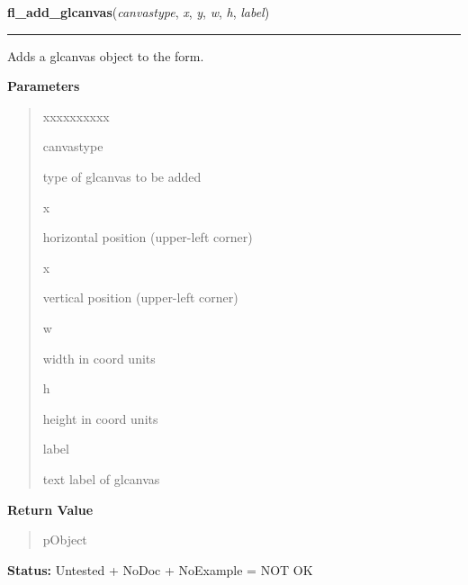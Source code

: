     \label{xformslib:library:fl_add_glcanvas}

    \vspace{0.5ex}

\hspace{.8\funcindent}\begin{boxedminipage}{\funcwidth}

    \raggedright \textbf{fl\_add\_glcanvas}(\textit{canvastype}, \textit{x}, \textit{y}, \textit{w}, \textit{h}, \textit{label})

    \vspace{-1.5ex}

    \rule{\textwidth}{0.5\fboxrule}
\setlength{\parskip}{2ex}
    Adds a glcanvas object to the form.

\setlength{\parskip}{1ex}
      \textbf{Parameters}
      \vspace{-1ex}

      \begin{quote}
        \begin{Ventry}{xxxxxxxxxx}

          \item[canvastype]

          type of glcanvas to be added

          \item[x]

          horizontal position (upper-left corner)

          \item[x]

          vertical position (upper-left corner)

          \item[w]

          width in coord units

          \item[h]

          height in coord units

          \item[label]

          text label of glcanvas

        \end{Ventry}

      \end{quote}

      \textbf{Return Value}
    \vspace{-1ex}

      \begin{quote}
      pObject

      \end{quote}

\textbf{Status:} Untested + NoDoc + NoExample = NOT OK



    \end{boxedminipage}


